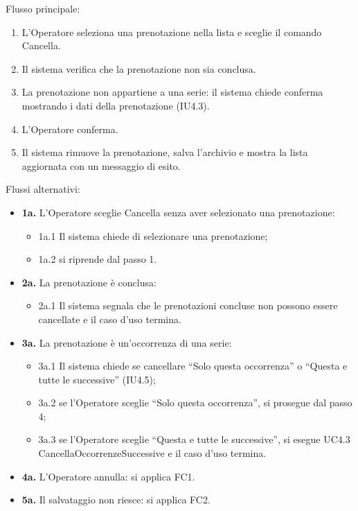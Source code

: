 \noindent Flusso principale:
\begin{enumerate}
\item L'Operatore seleziona una prenotazione nella lista e sceglie il comando Cancella.
\item Il sistema verifica che la prenotazione non sia conclusa.
\item La prenotazione non appartiene a una serie: il sistema chiede conferma mostrando i dati della prenotazione (IU4.3).
\item L'Operatore conferma.
\item Il sistema rimuove la prenotazione, salva l'archivio e mostra la lista aggiornata con un messaggio di esito.
\end{enumerate}
\noindent Flussi alternativi:
\begin{itemize}
\item \textbf{1a.} L'Operatore sceglie Cancella senza aver selezionato una prenotazione:
\begin{itemize}
\item 1a.1 Il sistema chiede di selezionare una prenotazione;
\item 1a.2 si riprende dal passo 1.
\end{itemize}
\item \textbf{2a.} La prenotazione è conclusa:
\begin{itemize}
\item 2a.1 Il sistema segnala che le prenotazioni concluse non possono essere cancellate e il caso d'uso termina.
\end{itemize}
\item \textbf{3a.} La prenotazione è un'occorrenza di una serie:
\begin{itemize}
\item 3a.1 Il sistema chiede se cancellare ``Solo questa occorrenza'' o ``Questa e tutte le successive'' (IU4.5);
\item 3a.2 se l'Operatore sceglie ``Solo questa occorrenza'', si prosegue dal passo 4;
\item 3a.3 se l'Operatore sceglie ``Questa e tutte le successive'', si esegue UC4.3 CancellaOccorrenzeSuccessive e il caso d'uso termina.
\end{itemize}
\item \textbf{4a.} L'Operatore annulla: si applica FC1.
\item \textbf{5a.} Il salvataggio non riesce: si applica FC2.
\end{itemize}

